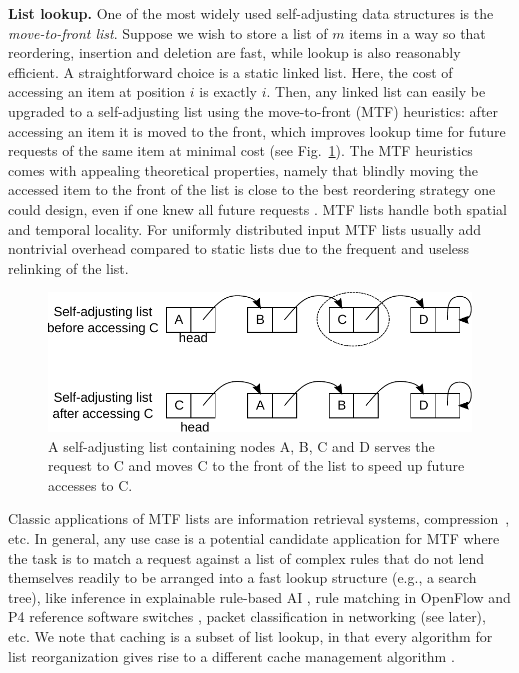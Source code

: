 \noindent%
\textbf{List lookup.} %
One of the most widely used self-adjusting data structures is the \emph{move-to-front list}. Suppose we wish to store a list of $m$ items in a way so that reordering, insertion and deletion are fast, while lookup is also reasonably efficient. A straightforward choice is a static linked list. Here, the cost of accessing an item at position $i$ is exactly $i$. Then, any linked list can easily be upgraded to a self-adjusting list using the move-to-front (MTF) heuristics: after accessing an item it is moved to the front, which improves lookup time for future requests of the same item at minimal cost (see Fig.~\ref{fig:mtf-example}). The MTF heuristics comes with appealing theoretical properties, namely that blindly moving the accessed item to the front of the list is close to the best reordering strategy one could design, even if one knew all future requests \cite{SleatorT85}. MTF lists handle both spatial and temporal locality. For uniformly distributed input MTF lists usually add nontrivial overhead compared to static lists due to the frequent and useless relinking of the list.

\begin{figure}
  \centering
  \includegraphics[width=.9\linewidth]{fig/mtf.pdf}
  \caption{A self-adjusting list containing nodes A, B, C and D serves the request to C and moves C to the front of the list to speed up future accesses to C.}
  \label{fig:mtf-example}
\end{figure}

Classic applications of MTF lists are information retrieval systems, compression~\cite{BentleySTW86}, etc. In general, any use case is a potential candidate application for MTF where the task is to match a request against a list of complex rules that do not lend themselves readily to be arranged into a fast lookup structure (e.g., a search tree), like inference in explainable rule-based AI %
\cite{dovsilovic2018explainable}, rule matching in OpenFlow and P4 reference software switches \cite{openflow}, packet classification in networking (see later), etc.  We note that caching is a subset of list lookup, in that every algorithm for list reorganization gives rise to a different cache management algorithm \cite{SleatorT85}.  

